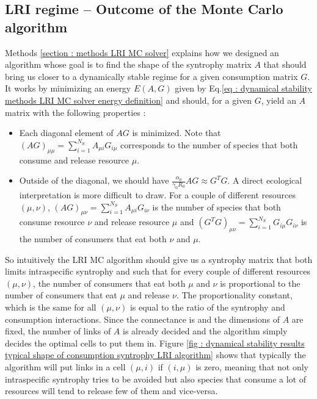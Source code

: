 \documentclass[12pt, titlepage]{report}
\begin{document}
\subsection{LRI regime -- Outcome of the Monte Carlo algorithm}
Methods \ref{section : methods LRI MC solver} explains how we designed an algorithm whose goal is to find the shape of the syntrophy matrix $A$ that should bring us closer to a dynamically stable regime for a given consumption matrix $G$. It works by minimizing an energy $E(A,G)$ given by Eq.\eqref{eq : dynamical stability methods LRI MC solver energy definition} and should, for a given $G$, yield an $A$ matrix with the following properties :
\begin{itemize}
\item Each diagonal element of $AG$ is minimized. Note that $(AG)_{\mu\mu}=\sum_{i=1}^{N_S} A_{\mu i} G_{i\mu}$ corresponds to the number of species that both consume and release resource $\mu$.
\item Outside of the diagonal, we should have $\frac{\alpha_0}{\gamma_0 R_0} AG \approx  G^T G$. A direct ecological interpretation is more difficult to draw. For a couple of different resources $(\mu,\nu)$,  $(AG)_{\mu\nu}=\sum_{i=1}^{N_S} A_{\mu i} G_{i\nu}$ is the number of species that both consume resource $\nu$ and release resource $\mu$ and $(G^TG)_{\mu\nu}=\sum_{i=1}^{N_S} G_{i\mu}G_{i\nu}$ is the number of consumers that eat both $\nu$ and $\mu$.
\end{itemize}
So intuitively the LRI MC algorithm should give us a syntrophy matrix that both limits intraspecific syntrophy and such that for every couple of different resources $(\mu, \nu)$, the number of consumers that eat both $\mu$ and $\nu$ is proportional to the number of consumers that eat $\mu$ and release $\nu$. The proportionality constant, which is the same for all $(\mu, \nu)$ is equal to the ratio of the syntrophy and consumption interactions.
 Since the connectance is and the dimensions of $A$ are fixed, the number of links of $A$ is already decided and the algorithm simply decides the optimal cells to put them in. Figure \ref{fig : dynamical stability results typical shape of consumption syntrophy LRI algorithm} shows that typically the algorithm will put links in a cell $(\mu,i)$ if $(i, \mu)$ is zero, meaning that not only intraspecific syntrophy tries to be avoided but also species that consume a lot of resources will tend to release few of them and vice-versa.
\end{document}
